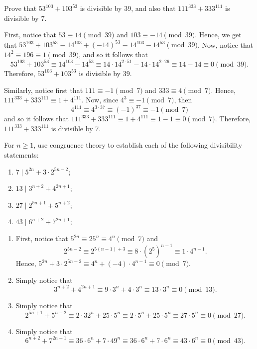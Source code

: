 \begin{exercise}
    Prove that $53^{103} + 103^{53}$ is divisible by $39$, and also that $111^{333} + 333^{111}$ is divisible by $7$. \\
\end{exercise}

\begin{solution}
    First, notice that $53 \equiv 14 \pmod{39}$ and $103 \equiv -14 \pmod{39}$. Hence, we get that $53^{103} + 103^{53} \equiv 14^{103} + (-14)^{53} \equiv 14^{103} - 14^{53} \pmod{39}$. Now, notice that $14^2 \equiv 196 \equiv 1 \pmod{39}$, and so it follows that 
    $$53^{103} + 103^{53} \equiv 14^{103} - 14^{53} \equiv 14\cdot 14^{2\cdot 51} - 14\cdot 14^{2\cdot 26} \equiv 14 - 14 \equiv 0 \pmod{39}.$$
    Therefore, $53^{103} + 103^{53}$ is divisible by $39$.

    Similarly, notice first that $111 \equiv -1 \pmod 7$ and $333 \equiv 4 \pmod 7$. Hence, $111^{333} + 333^{111} \equiv 1 + 4^{111}$. Now, since $4^3 \equiv -1 \pmod 7$, then
    $$4^{111} \equiv 4^{3\cdot 37} \equiv (-1)^{37} \equiv -1 \pmod 7$$
    and so it follows that $111^{333} + 333^{111} \equiv 1 + 4^{111} \equiv 1 - 1 \equiv 0 \pmod 7$. Therefore, $111^{333} + 333^{111}$ is divisible by 7. \\
\end{solution}

\begin{exercise}
    For $n \geq 1$, use congruence theory to establish each of the following divisibility statements:
    \begin{enumerate}
        \item $7 \mid 5^{2n} + 3\cdot 2^{5n - 2}$;
        \item $13 \mid 3^{n+2} + 4^{2n+1}$;
        \item $27 \mid 2^{5n+1} + 5^{n+2}$;
        \item $43 \mid 6^{n+2} + 7^{2n+1}$;
    \end{enumerate}
\end{exercise}

\begin{solution}
    \begin{enumerate}
        \item First, notice that $5^{2n} \equiv 25^n \equiv 4^n \pmod 7$ and
        $$2^{5n-2} \equiv 2^{5(n-1) + 3} \equiv 8\cdot (2^5)^{n-1} \equiv 1\cdot 4^{n-1}.$$
        Hence, $5^{2n} + 3\cdot 2^{5n - 2} \equiv 4^n + (-4) \cdot 4^{n-1} \equiv 0 \pmod 7$.
        \item Simply notice that
        $$3^{n+2} + 4^{2n+1} \equiv 9\cdot 3^n + 4 \cdot 3^n \equiv 13\cdot 3^n \equiv 0 \pmod{13}.$$
        \item Simply notice that
        $$2^{5n+1} + 5^{n+2} \equiv 2\cdot 32^n + 25 \cdot 5^n \equiv 2\cdot 5^n + 25 \cdot 5^n \equiv 27\cdot 5^n \equiv 0 \pmod{27}.$$
        \item Simply notice that
        $$6^{n+2} + 7^{2n+1} \equiv 36\cdot 6^n + 7 \cdot 49^n \equiv 36\cdot 6^n + 7 \cdot 6^n \equiv 43\cdot 6^n \equiv 0 \pmod{43}.$$
    \end{enumerate}
\end{solution}

